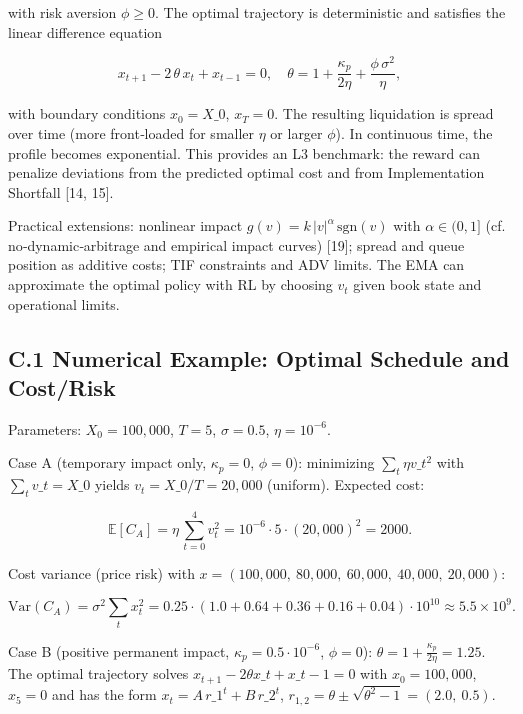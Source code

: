 \documentclass[11pt,a4paper]{article}
\begin{document}
with risk aversion $\phi\ge 0$. The optimal trajectory is deterministic and satisfies the linear difference equation

\begin{equation}
x_{t+1} - 2\,\theta\,x_t + x_{t-1} = 0,\quad \theta = 1 + \frac{\kappa_p}{2\eta} + \frac{\phi\,\sigma^2}{\eta},
\end{equation}

with boundary conditions $x_0=X\_0$, $x_T=0$. The resulting liquidation is spread over time (more front‑loaded for smaller $\eta$ or larger $\phi$). In continuous time, the profile becomes exponential. This provides an L3 benchmark: the reward can penalize deviations from the predicted optimal cost and from Implementation Shortfall [14, 15].

Practical extensions: nonlinear impact $g(v)=k\,|v|^\alpha\,\mathrm{sgn}(v)$ with $\alpha\in(0,1]$ (cf. no‑dynamic‑arbitrage and empirical impact curves) [19]; spread and queue position as additive costs; TIF constraints and ADV limits. The EMA can approximate the optimal policy with RL by choosing $v_t$ given book state and operational limits.

\subsection{C.1 Numerical Example: Optimal Schedule and Cost/Risk}

Parameters: $X_0=100,000$, $T=5$, $\sigma=0.5$, $\eta=10^{-6}$.

Case A (temporary impact only, $\kappa_p=0$, $\phi=0$): minimizing $\sum_t \eta v\_t^2$ with $\sum_t v\_t=X\_0$ yields $v_t=X\_0/T=20,000$ (uniform). Expected cost:

\begin{equation}
\mathbb{E}[C_A] = \eta\,\sum_{t=0}^{4} v_t^2 = 10^{-6}\cdot 5 \cdot (20,000)^2 = 2000.
\end{equation}

Cost variance (price risk) with $x=(100,000,\ 80,000,\ 60,000,\ 40,000,\ 20,000)$:

\begin{equation}
\mathrm{Var}(C_A) = \sigma^2\sum_t x_t^2 = 0.25\cdot(1.0+0.64+0.36+0.16+0.04)\cdot 10^{10} \approx 5.5\times 10^9.
\end{equation}

Case B (positive permanent impact, $\kappa_p=0.5\cdot 10^{-6}$, $\phi=0$): $\theta = 1 + \tfrac{\kappa_p}{2\eta} = 1.25$. The optimal trajectory solves $x_{t+1}-2\theta x\_t + x\_{t-1}=0$ with $x_0=100,000$, $x_5=0$ and has the form $x_t = A\,r\_1^t + B\,r\_2^t$, $r_{1,2}=\theta\pm\sqrt{\theta^2-1}=(2.0,\ 0.5)$. 
\end{document}
